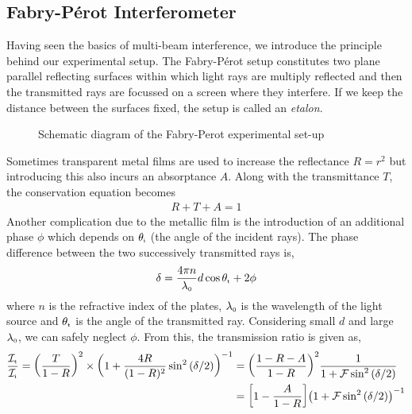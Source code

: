 \subsection{Fabry-P\'erot Interferometer}
Having seen the basics of multi-beam interference, we introduce the principle behind our experimental setup. The Fabry-P\'erot setup constitutes two plane parallel reflecting surfaces within which light rays are multiply reflected and then the transmitted rays are focussed on a screen where they interfere. If we keep the distance between the surfaces fixed, the setup is called an \textit{etalon}. 
\begin{figure}[H]
  \centering 
  
  \caption{Schematic diagram of the Fabry-Perot experimental set-up}
\end{figure}
\noindent 
Sometimes transparent metal films are used to increase the reflectance $R=r^2$ but introducing this also incurs an absorptance $A$. Along with the transmittance $T$, the conservation equation becomes 
\begin{align}
    R+T+A=1
\end{align}
Another complication due to the metallic film is the introduction of an additional phase $\phi$ which depends on $\theta_{\text{\tiny i}}$ (the angle of the incident rays). The phase difference between the two successively transmitted rays is,
\begin{equation}
    \delta = \frac{4\pi n}{\lambda_{\text{\tiny 0}}} d\cos\theta_{\text{\tiny t}}+2\phi
\end{equation}
where $n$ is the refractive index of the plates, $\lambda_{\text{\tiny 0}}$ is the wavelength of the light source and $\theta_{\text{\tiny t}}$ is the angle of the transmitted ray. Considering small $d$ and large $\lambda_{\text{\tiny 0}}$, we can safely neglect $\phi$. From this, the transmission ratio is given as, 
\begin{align}
   \begin{split}
     \frac{\mathcal{I}_{\text{\tiny t}}}{\mathcal{I}_{\text{\tiny i}}} = \qty(\frac{T}{1-R})^2 \times \qty({1+\frac{4R}{(1-R)^2}\sin^2\qty(\delta/2)})^{-1} &=\qty( \frac{1-R-A}{1-R})^2 \frac{1}{1+\mathcal{F}\sin^2\qty(\delta/2)}\\ &= \qty[1-\frac{A}{1-R}]\qty({1+\mathcal{F}\sin^2\qty(\delta/2)})^{-1}
   \end{split}
\end{align}
